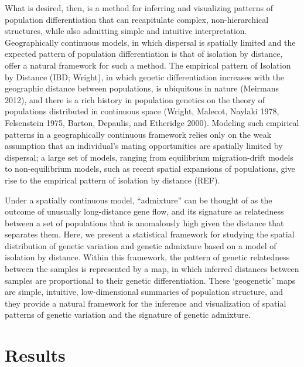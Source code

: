 \documentclass[12pt]{article}
\begin{document}
What is desired, then, is a method for inferring and visualizing patterns of population differentiation that can recapitulate complex, non-hierarchical structures, while also admitting simple and intuitive interpretation.  Geographically continuous models, in which dispersal is spatially limited and the expected pattern of population differentiation is that of isolation by distance, offer a natural framework for such a method.  The empirical pattern of Isolation by Distance (IBD; Wright), in which genetic differentiation increases with the geographic distance between populations, is ubiquitous in nature (Meirmans 2012), and there is a rich history in population genetics on the theory of populations distributed in continuous space (Wright, Malecot, Naylaki 1978, Felsenstein 1975, Barton, Depaulis, and Etheridge 2000).  Modeling such empirical patterns in a geographically continuous framework relies only on the weak assumption that an individual's mating opportunities are spatially limited by dispersal; a large set of models, ranging from equilibrium migration-drift models to non-equilibrium models, such as recent spatial expansions of populations, give rise to the empirical pattern of isolation by distance (REF).


Under a spatially continuous model, ``admixture'' can be thought of as the outcome of unusually long-distance gene flow, and its signature as relatedness between a set of populations that is anomalously high given the distance that separates them.  Here, we present a statistical framework for studying the spatial distribution of genetic variation and genetic admixture based on a model of isolation by distance. Within this framework, the pattern of genetic relatedness between the samples is represented by a map, in which inferred distances between samples are proportional to their genetic differentiation.  These `geogenetic'  maps are simple, intuitive, low-dimensional summaries of population structure, and they provide a natural framework for the inference and visualization of spatial patterns of genetic variation and the signature of genetic admixture.

\section*{Results}
\end{document}
